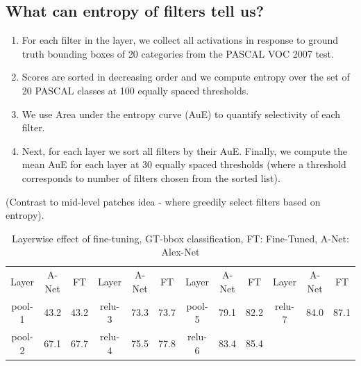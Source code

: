 \documentclass[runningheads]{llncs}
\begin{document}
\subsection{What can entropy of filters tell us?}
\begin{enumerate}
\item For each filter in the layer, we collect all activations in response to ground truth bounding boxes of 20 categories from the PASCAL VOC 2007 test. 
\item Scores are sorted in decreasing order and we compute entropy over the set of 20 PASCAL classes at 100 equally spaced thresholds.
\item We use Area under the entropy curve (AuE) to quantify selectivity of each filter. 
\item Next, for each layer we sort all filters by their AuE. Finally, we compute the mean AuE for each layer at 30 equally spaced thresholds (where a threshold corresponds to number of filters chosen from the sorted list).  
\end{enumerate}


(Contrast to mid-level patches idea - where greedily select filters based on entropy). 


\setlength{\tabcolsep}{4pt}
\begin{table}
\begin{center}
\caption{Layerwise effect of fine-tuning, GT-bbox classification, FT: Fine-Tuned, A-Net: Alex-Net}
\label{table:headings}
\begin{tabular}{ccc|ccc|ccc|ccc}
\hline\noalign{\smallskip}
Layer & A-Net & FT & Layer & A-Net & FT & Layer & A-Net & FT & Layer & A-Net & FT \\
\noalign{\smallskip}
\hline
\noalign{\smallskip}
pool-1 & 43.2 & 43.2  & relu-3 & 73.3 & 73.7 & pool-5 & 79.1 & 82.2 & relu-7 & 84.0 & 87.1 \\
pool-2  & 67.1 & 67.7 & relu-4 & 75.5 & 77.8 & relu-6 & 83.4 & 85.4 \\
\hline
\end{tabular}
\end{center}
\end{table}
\setlength{\tabcolsep}{1.4pt}
\end{document}
